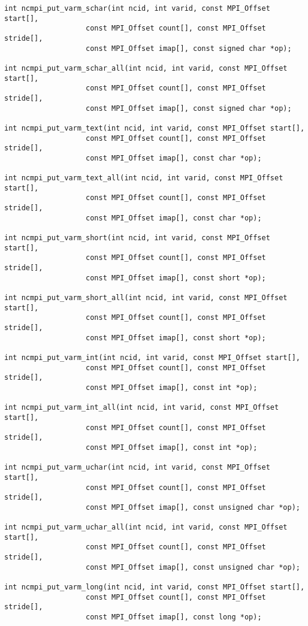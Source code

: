 \begin{verbatim}
int ncmpi_put_varm_schar(int ncid, int varid, const MPI_Offset start[],
                   const MPI_Offset count[], const MPI_Offset stride[],
                   const MPI_Offset imap[], const signed char *op);

int ncmpi_put_varm_schar_all(int ncid, int varid, const MPI_Offset start[],
                   const MPI_Offset count[], const MPI_Offset stride[],
                   const MPI_Offset imap[], const signed char *op);

int ncmpi_put_varm_text(int ncid, int varid, const MPI_Offset start[],
                   const MPI_Offset count[], const MPI_Offset stride[],
                   const MPI_Offset imap[], const char *op);

int ncmpi_put_varm_text_all(int ncid, int varid, const MPI_Offset start[],
                   const MPI_Offset count[], const MPI_Offset stride[],
                   const MPI_Offset imap[], const char *op);

int ncmpi_put_varm_short(int ncid, int varid, const MPI_Offset start[],
                   const MPI_Offset count[], const MPI_Offset stride[],
                   const MPI_Offset imap[], const short *op);

int ncmpi_put_varm_short_all(int ncid, int varid, const MPI_Offset start[],
                   const MPI_Offset count[], const MPI_Offset stride[],
                   const MPI_Offset imap[], const short *op);

int ncmpi_put_varm_int(int ncid, int varid, const MPI_Offset start[],
                   const MPI_Offset count[], const MPI_Offset stride[],
                   const MPI_Offset imap[], const int *op);

int ncmpi_put_varm_int_all(int ncid, int varid, const MPI_Offset start[],
                   const MPI_Offset count[], const MPI_Offset stride[],
                   const MPI_Offset imap[], const int *op);

int ncmpi_put_varm_uchar(int ncid, int varid, const MPI_Offset start[],
                   const MPI_Offset count[], const MPI_Offset stride[],
                   const MPI_Offset imap[], const unsigned char *op);

int ncmpi_put_varm_uchar_all(int ncid, int varid, const MPI_Offset start[],
                   const MPI_Offset count[], const MPI_Offset stride[],
                   const MPI_Offset imap[], const unsigned char *op);

int ncmpi_put_varm_long(int ncid, int varid, const MPI_Offset start[],
                   const MPI_Offset count[], const MPI_Offset stride[],
                   const MPI_Offset imap[], const long *op);


\end{verbatim}
